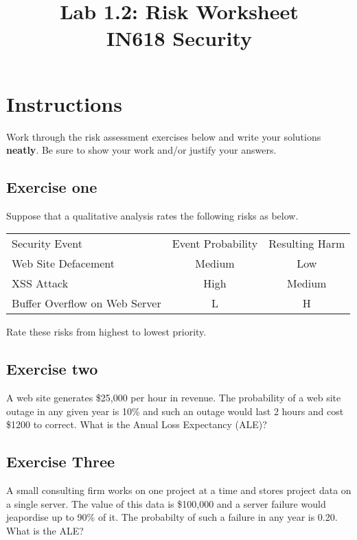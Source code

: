 \documentclass{article}
\begin{document}
\title{Lab 1.2: Risk Worksheet\\ IN618 Security}
\date{}
\maketitle

\section*{Instructions}
Work through the risk assessment exercises below and write your solutions \textbf{neatly}.  Be sure to show your work and/or justify your answers.

\subsection*{Exercise one}
Suppose that a qualitative analysis rates the following risks as below.

\vspace{5mm}

\begin{tabular}{l c c}
	Security Event & Event Probability & Resulting Harm \\
	Web Site Defacement & Medium & Low \\
	XSS Attack & High & Medium \\
	Buffer Overflow on Web Server & L & H \\

\end{tabular}

Rate these risks from highest to lowest priority.

\vspace{25mm}

\subsection*{Exercise two}
A web site generates \$25,000 per hour in revenue. The probability of a web site outage in any given year is 10\% and such an outage would last 2 hours and cost \$1200 to correct. What is the Anual Loss Expectancy (ALE)?

\newpage

\subsection*{Exercise Three}
A small consulting firm works on one project at a time and stores project data on a single server. The value of this data is \$100,000 and a server failure would jeapordise up to 90\% of it. The probabilty of such a failure in any year is 0.20.  What is the ALE?
\end{document}
